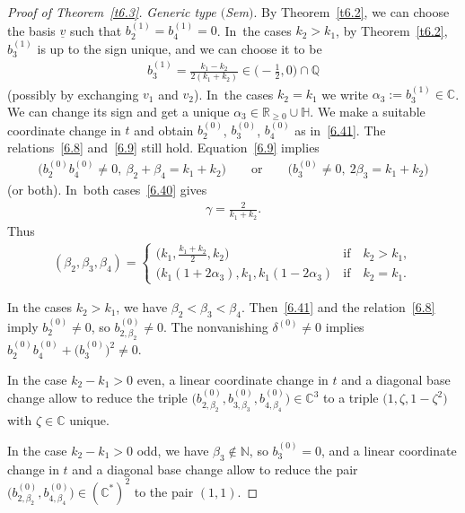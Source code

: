 \documentclass[pdftex]{sigma}%
\numberwithin{equation}{section}
\numberwithin{figure}{section}
\newcommand{\N}{{\mathbb N}}
\newcommand{\Q}{{\mathbb Q}}
\newcommand{\C}{{\mathbb C}}
\newcommand{\R}{{\mathbb R}}
\renewcommand{\H}{{\mathbb H}}
\newcommand{\uuuu}{\underline}
\begin{document}
\begin{proof}[Proof of Theorem~\ref{t6.3}]
\medskip\noindent
{\it Generic type $($Sem$)$}.
By Theorem~\ref{t6.2}, we can choose the basis $\uuuu{v}$
such that $b_2^{(1)}=b_4^{(1)}=0$. In~the cases $k_2>k_1$, by Theorem~\ref{t6.2},
$b_3^{(1)}$ is up to the sign unique, and we can choose it
to be
\begin{gather*}
b_3^{(1)}=\frac{k_1-k_2}{2(k_1+k_2)}\in\bigg({-}\frac{1}{2},0\bigg)\cap\Q
\end{gather*}
(possibly by exchanging $v_1$ and $v_2$). In~the cases $k_2=k_1$
we write $\alpha_3:=b_3^{(1)}\in\C$.
We can change its sign and get a unique
$\alpha_3\in\R_{\geq 0}\cup\H$.
We make a suitable coordinate change in $t$ and obtain
$b_2^{(0)}$, $b_3^{(0)}$, $b_4^{(0)}$ as in~\eqref{6.41}.
The relations~\eqref{6.8} and~\eqref{6.9} still hold.
Equation~\eqref{6.9} implies
\begin{gather*}
\big(b_2^{(0)}b_4^{(0)}\neq 0,\ \beta_2+\beta_4=k_1+k_2\big)
\qquad\text{or}\qquad
\big(b_3^{(0)}\neq 0,\ 2\beta_3=k_1+k_2\big)
\end{gather*}
(or both). In~both cases~\eqref{6.40} gives
\begin{gather*}%
\gamma=\frac{2}{k_1+k_2}.
\end{gather*}
Thus
\begin{gather}\label{6.43}
(\beta_2,\beta_3,\beta_4)=
\begin{cases}
\big(k_1,\frac{k_1+k_2}{2},k_2\big)&\text{if}\quad k_2>k_1,
\\
(k_1(1+2\alpha_3),k_1,k_1(1-2\alpha_3)&\text{if}\quad k_2=k_1.\end{cases}
\end{gather}

In the cases $k_2>k_1$, we have $\beta_2<\beta_3<\beta_4$.
Then~\eqref{6.41} and the relation~\eqref{6.8} imply
$b_2^{(0)}\neq 0$, so $b_{2,\beta_2}^{(0)}\neq 0$.
The nonvanishing $\delta^{(0)}\neq 0 $ implies
$b_{2}^{(0)}b_{4}^{(0)}+\big(b_{3}^{(0)}\big)^2
\neq 0$.

In the case $k_2-k_1>0$ even, a linear coordinate change in $t$
and a diagonal base change allow to reduce the triple
$\big(b_{2,\beta_2}^{(0)},b_{3,\beta_3}^{(0)},b_{4,\beta_4}^{(0)}\big)
\in\C^3$ to a triple $\big(1,\zeta,1-\zeta^2\big)$
with $\zeta\in\C$ unique.

In the case $k_2-k_1>0$ odd, we have $\beta_3\notin\N$,
so $b_3^{(0)}=0$,
and a linear coordinate change in $t$ and a diagonal base
change allow to reduce the pair
$\big(b_{2,\beta_2}^{(0)},b_{4,\beta_4}^{(0)}\big)
\in(\C^*)^2$ to the pair $(1,1)$.


\end{proof}
\end{document}
